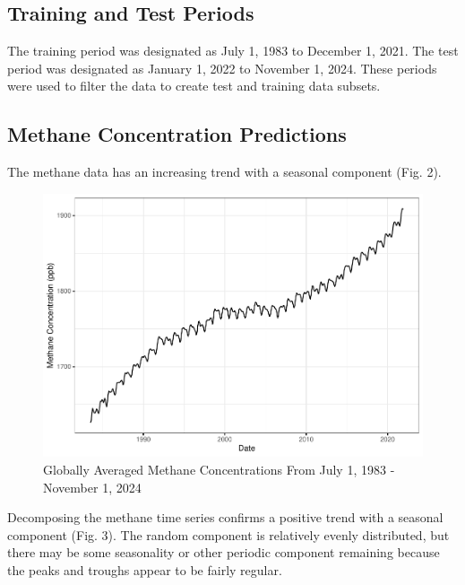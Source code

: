\documentclass[
]{article}
\begin{document}
\subsection{Training and Test Periods}\label{training-and-test-periods}

The training period was designated as July 1, 1983 to December 1, 2021.
The test period was designated as January 1, 2022 to November 1, 2024.
These periods were used to filter the data to create test and training
data subsets.

\subsection{Methane Concentration
Predictions}\label{methane-concentration-predictions}

The methane data has an increasing trend with a seasonal component (Fig.
2).

\begin{figure}
\centering
\includegraphics{Final_Report_files/figure-latex/unnamed-chunk-5-1.pdf}
\caption{Globally Averaged Methane Concentrations From July 1, 1983 -
November 1, 2024}
\end{figure}

Decomposing the methane time series confirms a positive trend with a
seasonal component (Fig. 3). The random component is relatively evenly
distributed, but there may be some seasonality or other periodic
component remaining because the peaks and troughs appear to be fairly
regular.
\end{document}
